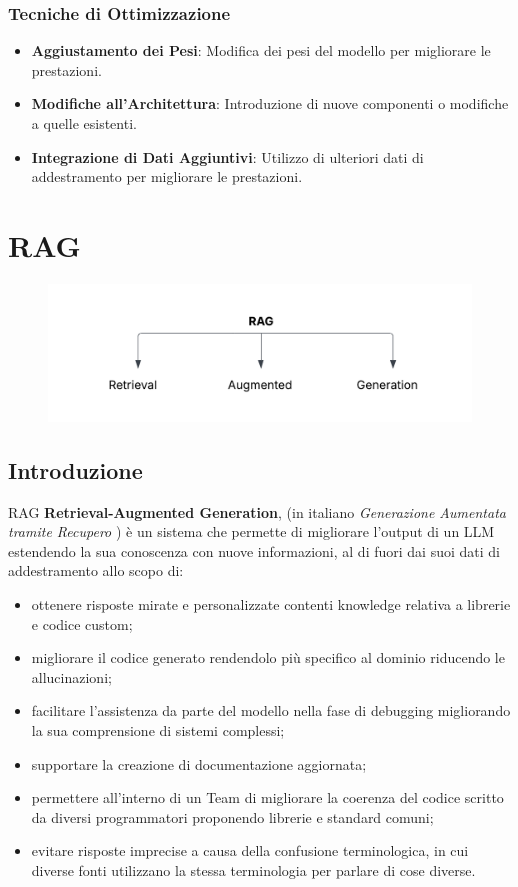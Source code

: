 \documentclass[12pt,a4paper,openright,twoside]{book}
\begin{document}
\subsection{Tecniche di Ottimizzazione}
\begin{itemize}
    \item \textbf{Aggiustamento dei Pesi}: Modifica dei pesi del modello per migliorare le prestazioni.
    \item \textbf{Modifiche all'Architettura}: Introduzione di nuove componenti o modifiche a quelle esistenti.
    \item \textbf{Integrazione di Dati Aggiuntivi}: Utilizzo di ulteriori dati di addestramento per migliorare le prestazioni.
\end{itemize}

\chapter{RAG}
\begin{figure}[h]
    \raggedright
    \includegraphics[width=0.8\linewidth]{figures/RAGDefinizione.png}
    \label{fig:significa-RAG}
\end{figure}
\section{Introduzione}
RAG \textbf{Retrieval-Augmented Generation}, (in italiano \textit{Generazione Aumentata tramite Recupero} )  è un sistema che permette di migliorare l'output di un LLM estendendo la sua conoscenza con nuove informazioni, al di fuori dai suoi dati di addestramento allo scopo di:
\begin{itemize}
    \item ottenere risposte mirate e personalizzate contenti knowledge relativa a librerie e codice custom;
    \item migliorare il codice generato rendendolo più specifico al dominio riducendo le allucinazioni;
    \item facilitare l'assistenza da parte del modello nella fase di debugging migliorando la sua comprensione di sistemi complessi;
    \item supportare la creazione di documentazione aggiornata;
    \item permettere all'interno di un Team di migliorare la coerenza del codice scritto da diversi programmatori proponendo librerie e standard comuni;
    \item evitare risposte imprecise a causa della confusione terminologica, in cui diverse fonti utilizzano la stessa terminologia per parlare di cose diverse.
\end{itemize}
\newpage
\end{document}
